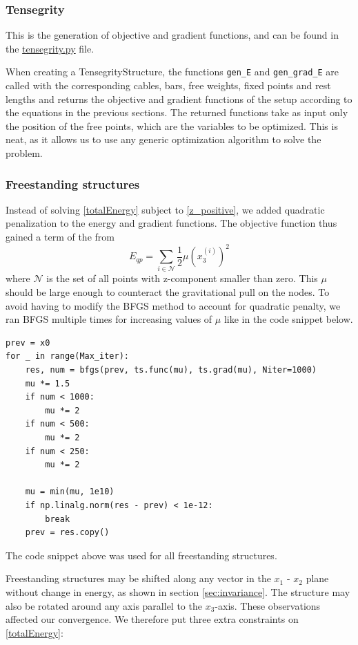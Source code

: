 \subsubsection{Tensegrity}
This is the generation of objective and gradient functions, and can be found in the \href{https://github.com/otkulseng/Opt1_Project/blob/main/Kode/tensegrity.py}{tensegrity.py} file. 

When creating a TensegrityStructure, the functions \lstinline{gen_E}  and \lstinline{gen_grad_E} are called with the corresponding cables, bars, free weights, fixed points and rest lengths and returns the objective and gradient functions of the setup according to the equations in the previous sections. The returned functions take as input only the position of the free points, which are the variables to be optimized. This is neat, as it allows us to use any generic optimization algorithm to solve the problem.

\subsubsection{Freestanding structures}
Instead of solving \eqref{totalEnergy} subject to \eqref{z_positive}, we added quadratic penalization to the energy and gradient functions. The objective function thus gained a term of the from 
\begin{equation}
    E_{qp} = \sum_{i \in \mathcal{N}} \frac{1}{2} \mu (x_3^{(i)})^2
\end{equation}
where $\mathcal{N}$ is the set of all points with z-component smaller than zero. This $\mu$ should be large enough to counteract the gravitational pull on the nodes. To avoid having to modify the BFGS method to account for quadratic penalty, we ran BFGS multiple times for increasing values of $\mu$ like in the code snippet below.

\begin{lstlisting}
prev = x0
for _ in range(Max_iter):
    res, num = bfgs(prev, ts.func(mu), ts.grad(mu), Niter=1000)
    mu *= 1.5
    if num < 1000:
        mu *= 2
    if num < 500:
        mu *= 2
    if num < 250:
        mu *= 2

    mu = min(mu, 1e10)
    if np.linalg.norm(res - prev) < 1e-12:
        break
    prev = res.copy()
\end{lstlisting}
The code snippet above was used for all freestanding structures.

Freestanding structures may be shifted along any vector in the $x_1$ - $x_2$ plane without change in energy, as shown in section \ref{sec:invariance}. The structure may also be rotated around any axis parallel to the $x_3$-axis. These observations affected our convergence. We therefore put three extra constraints on \ref{totalEnergy}:

